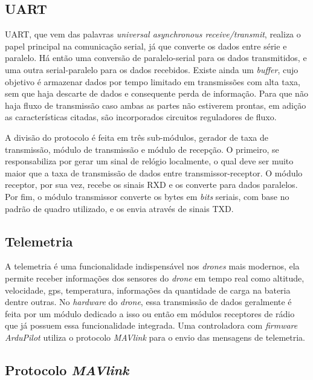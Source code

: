 \documentclass[12pt,a4paper,oneside]{book}
\begin{document}
\subsection{UART}

UART, que vem das palavras \textit{universal asynchronous receive/transmit}, realiza o papel principal na comunicação serial, já que converte os dados entre série e paralelo. Há então uma conversão de paralelo-serial para os dados transmitidos, e uma outra serial-paralelo para os dados recebidos. Existe ainda um \textit{buffer}, cujo objetivo é armazenar dados por tempo limitado em transmissões com alta taxa, sem que haja descarte de dados e consequente perda de informação. Para que não haja fluxo de transmissão caso ambas as partes não estiverem prontas, em adição as características citadas, são incorporados circuitos reguladores de fluxo.

A divisão do protocolo é feita em três sub-módulos, gerador de taxa de transmissão, módulo de transmissão e módulo de recepção. O primeiro, se responsabiliza por gerar um sinal de relógio localmente, o qual deve ser muito maior que a taxa de transmissão de dados entre transmissor-receptor. O módulo receptor, por sua vez, recebe os sinais RXD e os converte para dados paralelos. Por fim, o módulo transmissor converte os bytes em \textit{bits} seriais, com base no padrão de quadro utilizado, e os envia através de sinais TXD. \cite{uart}

\subsection{Telemetria}

A telemetria é uma funcionalidade indispensável nos \textit{drones} mais modernos, ela permite receber informações dos sensores do \textit{drone} em tempo real como altitude, velocidade, gps, temperatura, informações da quantidade de carga na bateria dentre outras. No  \textit{hardware} do \textit{drone}, essa transmissão de dados geralmente é feita por um módulo dedicado a isso ou então em módulos receptores de rádio que já possuem essa funcionalidade integrada. Uma controladora com \textit{firmware ArduPilot} utiliza o protocolo \textit{MAVlink} para o envio das mensagens de telemetria.

\subsection{Protocolo \textit{MAVlink}}
\end{document}
